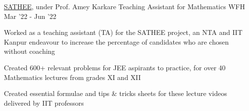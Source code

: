 \begin{cventries}
  \excventry
  {\href{https://satheejee.prutor.ai/}{SATHEE}, under Prof. Amey Karkare}
  {Teaching Assistant for Mathematics}
  {WFH}
  {Mar '22 - Jun '22}
  {
    \begin{cvitems}
      \item Worked as a teaching assistant (TA) for the SATHEE project, an NTA and IIT Kanpur endeavour to increase the percentage of candidates who are chosen without coaching
      \item Created 600+ relevant problems for JEE aspirants to practice, for over 40 Mathematics lectures from grades XI and XII
      \item Created essential formulae and tips \& tricks sheets for these lecture videos delivered by IIT professors
    \end{cvitems}
  }
\end{cventries}